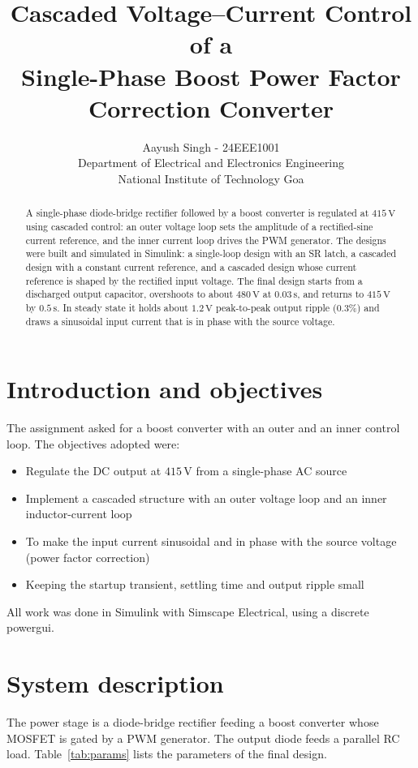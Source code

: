 \documentclass[11pt,a4paper]{article}
\title{Cascaded Voltage--Current Control of a\\Single-Phase Boost Power Factor Correction Converter}
\author{Aayush Singh - 24EEE1001\\[2pt]
Department of Electrical and Electronics Engineering\\
National Institute of Technology Goa}
\date{}
\begin{document}
\maketitle

\begin{abstract}
A single-phase diode-bridge rectifier followed by a boost converter is regulated at $415\,\mathrm{V}$ using cascaded control: an outer voltage loop sets the amplitude of a rectified-sine current reference, and the inner current loop drives the PWM generator. The designs were built and simulated in Simulink: a single-loop design with an SR latch, a cascaded design with a constant current reference, and a cascaded design whose current reference is shaped by the rectified input voltage. The final design starts from a discharged output capacitor, overshoots to about $480\,\mathrm{V}$ at $0.03\,\mathrm{s}$, and returns to $415\,\mathrm{V}$ by $0.5\,\mathrm{s}$. In steady state it holds about $1.2\,\mathrm{V}$ peak-to-peak output ripple ($0.3\%$) and draws a sinusoidal input current that is in phase with the source voltage.
\end{abstract}

\section{Introduction and objectives}
The assignment asked for a boost converter with an outer and an inner control loop. The objectives adopted were:
\begin{itemize}[nosep]
  \item Regulate the DC output at $415\,\mathrm{V}$ from a single-phase AC source
  \item Implement a cascaded structure with an outer voltage loop and an inner inductor-current loop
  \item To make the input current sinusoidal and in phase with the source voltage (power factor correction)
  \item Keeping the startup transient, settling time and output ripple small
\end{itemize}
All work was done in Simulink with Simscape Electrical, using a discrete powergui.

\section{System description}
The power stage is a diode-bridge rectifier feeding a boost converter whose MOSFET is gated by a PWM generator. The output diode feeds a parallel RC load. Table~\ref{tab:params} lists the parameters of the final design.
\end{document}

